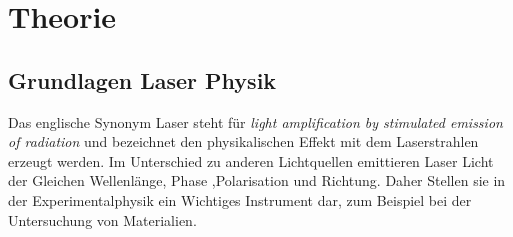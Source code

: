 \section{Theorie}
\label{sec:Theorie}

\subsection{Grundlagen Laser Physik}
Das englische Synonym Laser steht für \textit{light amplification by stimulated emission of radiation}
und bezeichnet den physikalischen Effekt mit dem  Laserstrahlen erzeugt werden.
Im Unterschied zu anderen Lichtquellen emittieren Laser Licht der Gleichen Wellenlänge, Phase ,Polarisation und Richtung. 
Daher Stellen sie in der Experimentalphysik ein Wichtiges Instrument dar,
zum Beispiel bei der Untersuchung von Materialien.

